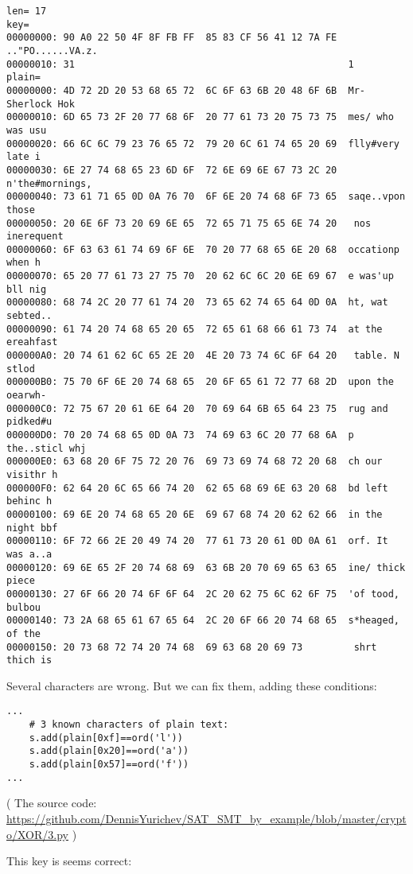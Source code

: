 \begin{lstlisting}
len= 17
key=
00000000: 90 A0 22 50 4F 8F FB FF  85 83 CF 56 41 12 7A FE  .."PO......VA.z.
00000010: 31                                                1
plain=
00000000: 4D 72 2D 20 53 68 65 72  6C 6F 63 6B 20 48 6F 6B  Mr- Sherlock Hok
00000010: 6D 65 73 2F 20 77 68 6F  20 77 61 73 20 75 73 75  mes/ who was usu
00000020: 66 6C 6C 79 23 76 65 72  79 20 6C 61 74 65 20 69  flly#very late i
00000030: 6E 27 74 68 65 23 6D 6F  72 6E 69 6E 67 73 2C 20  n'the#mornings,
00000040: 73 61 71 65 0D 0A 76 70  6F 6E 20 74 68 6F 73 65  saqe..vpon those
00000050: 20 6E 6F 73 20 69 6E 65  72 65 71 75 65 6E 74 20   nos inerequent
00000060: 6F 63 63 61 74 69 6F 6E  70 20 77 68 65 6E 20 68  occationp when h
00000070: 65 20 77 61 73 27 75 70  20 62 6C 6C 20 6E 69 67  e was'up bll nig
00000080: 68 74 2C 20 77 61 74 20  73 65 62 74 65 64 0D 0A  ht, wat sebted..
00000090: 61 74 20 74 68 65 20 65  72 65 61 68 66 61 73 74  at the ereahfast
000000A0: 20 74 61 62 6C 65 2E 20  4E 20 73 74 6C 6F 64 20   table. N stlod
000000B0: 75 70 6F 6E 20 74 68 65  20 6F 65 61 72 77 68 2D  upon the oearwh-
000000C0: 72 75 67 20 61 6E 64 20  70 69 64 6B 65 64 23 75  rug and pidked#u
000000D0: 70 20 74 68 65 0D 0A 73  74 69 63 6C 20 77 68 6A  p the..sticl whj
000000E0: 63 68 20 6F 75 72 20 76  69 73 69 74 68 72 20 68  ch our visithr h
000000F0: 62 64 20 6C 65 66 74 20  62 65 68 69 6E 63 20 68  bd left behinc h
00000100: 69 6E 20 74 68 65 20 6E  69 67 68 74 20 62 62 66  in the night bbf
00000110: 6F 72 66 2E 20 49 74 20  77 61 73 20 61 0D 0A 61  orf. It was a..a
00000120: 69 6E 65 2F 20 74 68 69  63 6B 20 70 69 65 63 65  ine/ thick piece
00000130: 27 6F 66 20 74 6F 6F 64  2C 20 62 75 6C 62 6F 75  'of tood, bulbou
00000140: 73 2A 68 65 61 67 65 64  2C 20 6F 66 20 74 68 65  s*heaged, of the
00000150: 20 73 68 72 74 20 74 68  69 63 68 20 69 73         shrt thich is
\end{lstlisting}

Several characters are wrong.
But we can fix them, adding these conditions:

\begin{lstlisting}
...
    # 3 known characters of plain text:
    s.add(plain[0xf]==ord('l'))
    s.add(plain[0x20]==ord('a'))
    s.add(plain[0x57]==ord('f'))
...
\end{lstlisting}

( The source code: \url{https://github.com/DennisYurichev/SAT_SMT_by_example/blob/master/crypto/XOR/3.py} )

This key is seems correct:

